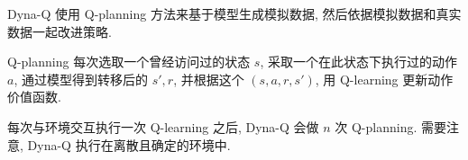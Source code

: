 Dyna-Q 使用 Q-planning 方法来基于模型生成模拟数据, 然后依据模拟数据和真实数据一起改进策略. 

Q-planning 每次选取一个曾经访问过的状态 $s$, 采取一个在此状态下执行过的动作 $a$, 通过模型得到转移后的 $s', r$, 并根据这个 $(s,a,r,s')$, 用 Q-learning 更新动作价值函数. 

每次与环境交互执行一次 Q-learning 之后, Dyna-Q 会做 $n$ 次 Q-planning. 需要注意, Dyna-Q 执行在离散且确定的环境中. 